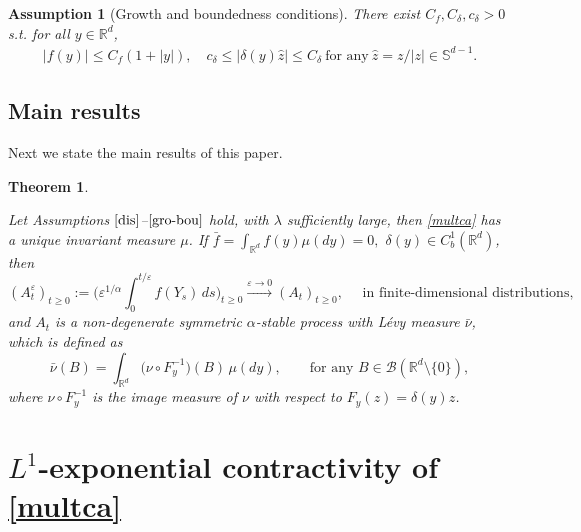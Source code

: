 \documentclass[11pt,reqno]{amsart}
\newtheorem{theorem}{\indent Theorem}[section]
\newtheorem{assumption}{\indent Assumption}[section]
\numberwithin{equation}{section}
\newcommand{\s}{\mathbb{S}}
\newcommand{\de}{\delta}
\begin{document}
\begin{assumption}[Growth and boundedness conditions]\label{gro-bou}
There exist $C_f,C_\delta,c_\delta>0$ s.t.  for all
$y\in\mathbb{R}^{d}$,
\begin{align*}
 |f(y)| \leq C_{f}(1+|y|),\quad   
 c_\delta\le|\de(y) \hat{z}|\le C_\delta \ \text{for any}\ \hat{z}=z/|z|\in\s^{d-1}.
\end{align*}
\end{assumption}







\subsection{Main results}
  Next we state the main results of this paper.






\begin{theorem}\label{addi-func}
	
	Let  Assumptions $\ref{dis}$--$\ref{gro-bou}$ hold, with  $\lambda$ sufficiently large,
	then \eqref{multca} has a unique invariant measure  $\mu$. If $\bar{f}=\int_{\mathbb{R}^{ d}}f(y)\mu(dy)=0,$   $\de(y)\in C_{b}^{ 1}(\mathbb{R}^{ d})$,  then %
	$$
	(A_t^\varepsilon)_{t\geq0}:=\bigg(\varepsilon^{1/\alpha}
	\int_0^{t/\varepsilon}f(Y_s)\,ds\bigg)_{t\geq0} \xrightarrow{\varepsilon\to0}  (A_t)_{t\geq0}, \quad   \text{ in finite-dimensional distributions,}
	$$
	and $A_t$ is a non-degenerate symmetric $\alpha$-stable process with  L\'evy measure $\bar{\nu}$, which is defined as
	\begin{equation}\label{lim-lev}
		\bar{\nu}(B)=\int_{\mathbb R^d}
		\bigl(\nu\circ F_y^{-1}\bigr)(B)\,\mu(dy),
		\qquad \text{for any } B\in\mathcal{B}(\mathbb{R}^d\setminus\{0\}),
	\end{equation}
	where $\nu\circ F_y^{-1}$ is the image measure of $\nu$ with respect to $ F_y(z)=\delta(y)z$.
\end{theorem}






\section{$L^1$-exponential contractivity of \eqref{multca}}\label{con}
\end{document}
